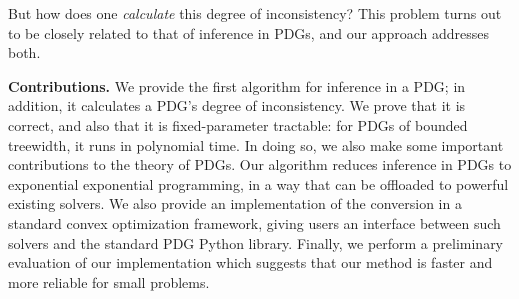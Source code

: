\documentclass{article}
\begin{document}
{%
        But how {does} one \emph{calculate} this degree of inconsistency?
This problem turns out to be closely related to that of
    inference in PDGs, and our approach addresses both.
}



\textbf{Contributions.}
We provide the first algorithm for inference in a PDG;
in addition, it calculates a PDG's degree of inconsistency. 
We prove that it is correct, and also
that it is fixed-parameter tractable: for PDGs of bounded treewidth,
it runs in polynomial time.
In doing so, we also make some important contributions to the theory of PDGs.
Our algorithm reduces inference in PDGs to exponential exponential programming,
in a way that can be offloaded to powerful existing solvers.
We also provide an implementation of the conversion in a
standard convex optimization framework, giving users an
interface between such solvers and the standard PDG Python library.
Finally, we perform a preliminary evaluation of our implementation which suggests that our method is faster and more reliable for small problems.
%
\end{document}
